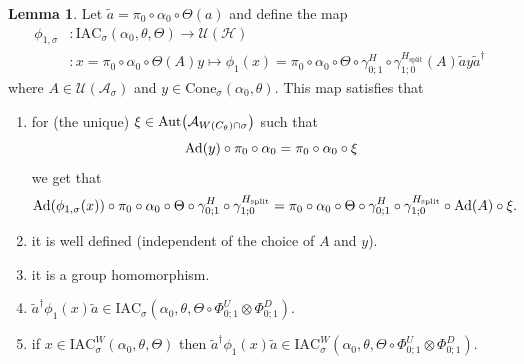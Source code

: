 \documentclass[12pt,a4paper,twoside]{article}
\newcommand{\IAC}{\textrm{IAC}}
\let\originalleft\left
\let\originalright\right
\renewcommand{\left}{\mathopen{}\mathclose\bgroup\originalleft}
\renewcommand{\right}{\aftergroup\egroup\originalright}
\newcommand{\UU}{\mathcal U}
\newcommand{\HH}{\mathcal H}
\renewcommand{\AA}{\mathcal A}
\newcommand{\Ad}[1]{\textrm{Ad}\left(#1\right)}
\newcommand{\Aut}[1]{\textrm{Aut}\left(#1\right)}
\theoremstyle{definition}
\newtheorem{lemma}[theorem]{Lemma}
\numberwithin{equation}{section}
\begin{document}
\begin{lemma}\label{lem:DefinitionOfGroupMorphism}
	Let $\tilde{a}=\pi_0\circ\alpha_0\circ\Theta(a)$ and define the map
	\begin{align}
		\phi_{1,\sigma}&:\IAC_\sigma(\alpha_0,\theta,\Theta) \rightarrow \UU(\HH)\\
		\nonumber
		&:x=\pi_0\circ\alpha_0\circ\Theta(A)y\mapsto \phi_1(x)=\pi_0\circ\alpha_0\circ\Theta\circ\gamma^H_{0;1}\circ\gamma^{H_\text{split}}_{1;0}(A)\tilde{a}y\tilde{a}^\dagger
	\end{align}
	where $A\in\UU(\AA_\sigma)$ and $y\in\textrm{Cone}_\sigma(\alpha_0,\theta)$. This map satisfies that
	\begin{enumerate}
		\item  for (the unique) $\xi\in\Aut{\AA_{W(C_\theta)\cap\sigma}}$ such that
		\begin{equation}
			\Ad{y}\circ\pi_0\circ\alpha_0=\pi_0\circ\alpha_0\circ\xi
		\end{equation}
		we get that
		\begin{equation}\label{eq:ConditionDefinitionOfGroupMorphism}
			\Ad{\phi_{1,\sigma}(x)}\circ\pi_0\circ\alpha_0\circ\Theta\circ\gamma^H_{0;1}\circ\gamma^{H_\text{split}}_{1;0}=\pi_0\circ\alpha_0\circ\Theta\circ\gamma^H_{0;1}\circ\gamma^{H_\text{split}}_{1;0}\circ\Ad{A}\circ\xi.
		\end{equation}
		\item it is well defined (independent of the choice of $A$ and $y$).
		\item it is a group homomorphism.
		\item $\tilde{a}^\dagger \phi_1(x)\tilde{a}\in\IAC_\sigma(\alpha_0,\theta,\Theta\circ \Phi^U_{0;1}\otimes\Phi^D_{0;1})$.
		\item if $x\in \IAC_\sigma^W(\alpha_0,\theta,\Theta)$ then  $\tilde{a}^\dagger \phi_1(x)\tilde{a}\in\IAC_\sigma^W(\alpha_0,\theta,\Theta\circ \Phi^U_{0;1}\otimes\Phi^D_{0;1})$.
	\end{enumerate}
\end{lemma}
\end{document}
